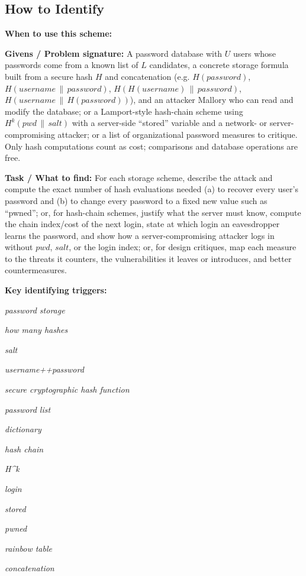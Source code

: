 \documentclass[12pt, a4paper]{article}
\begin{document}
\subsection*{How to Identify}

\textbf{When to use this scheme:}

\textbf{Givens / Problem signature:}
A password database with $U$ users whose passwords come from a known list of $L$ candidates, a concrete storage formula built from a secure hash $H$ and concatenation (e.g. $H(password)$, $H(username \,\|\, password)$, $H(H(username) \,\|\, password)$, $H(username \,\|\, H(password))$), and an attacker Mallory who can read and modify the database; or a Lamport-style hash-chain scheme using $H^{k}(pwd \,\|\, salt)$ with a server-side ``stored'' variable and a network- or server-compromising attacker; or a list of organizational password measures to critique.
Only hash computations count as cost; comparisons and database operations are free.

\textbf{Task / What to find:}
For each storage scheme, describe the attack and compute the exact number of hash evaluations needed (a) to recover every user's password and (b) to change every password to a fixed new value such as ``pwned''; or, for hash-chain schemes, justify what the server must know, compute the chain index/cost of the next login, state at which login an eavesdropper learns the password, and show how a server-compromising attacker logs in without $pwd$, $salt$, or the login index; or, for design critiques, map each measure to the threats it counters, the vulnerabilities it leaves or introduces, and better countermeasures.

\textbf{Key identifying triggers:}
\begin{tightitem}
        \item \textit{password storage}
        \item \textit{how many hashes}
        \item \textit{salt}
        \item \textit{username++password}
        \item \textit{secure cryptographic hash function}
        \item \textit{password list}
        \item \textit{dictionary}
        \item \textit{hash chain}
        \item \textit{H\textasciicircum k}
        \item \textit{login}
        \item \textit{stored}
        \item \textit{pwned}
        \item \textit{rainbow table}
        \item \textit{concatenation}
    \end{tightitem}
\end{document}
